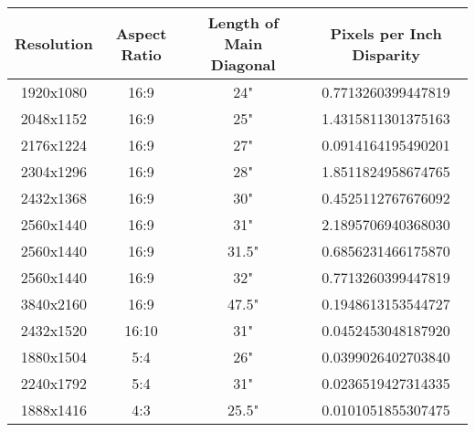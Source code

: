 \documentclass[12pt,letterpaper]{amsart}
\begin{document}
  \noindent \begin{tabular}{| c | c | c | c |} \hline
    \textbf{Resolution}
    & \textbf{Aspect Ratio}
    & \textbf{Length of Main Diagonal}
    & \textbf{Pixels per Inch Disparity} \\
    \hline
    1920x1080
    & 16:9
    & 24"
    & 0.7713260399447819 \\
    2048x1152
    & 16:9
    & 25"
    & 1.4315811301375163 \\
    2176x1224
    & 16:9
    & 27"
    & 0.0914164195490201 \\
    2304x1296
    & 16:9
    & 28"
    & 1.8511824958674765 \\
    2432x1368
    & 16:9
    & 30"
    & 0.4525112767676092 \\
    2560x1440
    & 16:9
    & 31"
    & 2.1895706940368030 \\
    2560x1440
    & 16:9
    & 31.5"
    & 0.6856231466175870 \\
    2560x1440
    & 16:9
    & 32"
    & 0.7713260399447819 \\
    3840x2160
    & 16:9
    & 47.5"
    & 0.1948613153544727 \\
    \hline
    2432x1520
    & 16:10
    & 31"
    & 0.0452453048187920 \\
    1880x1504
    & 5:4
    & 26"
    & 0.0399026402703840 \\
    2240x1792
    & 5:4
    & 31"
    & 0.0236519427314335 \\
    1888x1416
    & 4:3
    & 25.5"
    & 0.0101051855307475 \\
    \hline
  \end{tabular}
  
  \break
  
\end{document}

